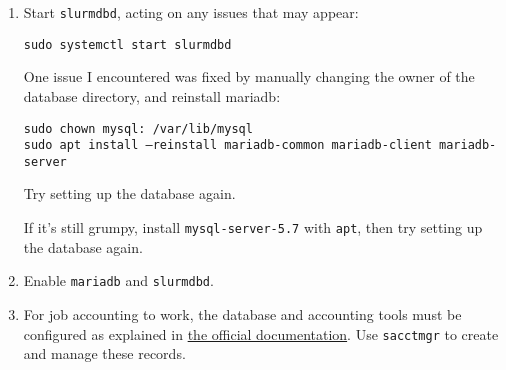 \begin{enumerate}
\begin{enumerate}
        \begin{verbatim}
		[mysqld]
		innodb_buffer_pool_size=256M
		innodb_log_file_size=256M
		innodb_lock_wait_timeout=1800
        \end{verbatim}

        To implement this change you must shut down the database and move/remove the log files:

        \begin{verbatim}
		sudo systemctl stop mariadb
		sudo rm /var/lib/mysql/ib_logfile?
		sudo systemctl start mariadb
        \end{verbatim}

        Verify the new buffer setting using the following command in the MariaDB shell:

        \texttt{MariaDB [(none)]> SHOW VARIABLES LIKE innodb\_buffer\_pool\_size;}

        This has been left as the default for now (obviously).

      \item Exit MariaDB:

        \texttt{MariaDB [(none)]> QUIT;}
    \end{enumerate}

  \item Start \texttt{slurmdbd}, acting on any issues that may appear:

    \texttt{sudo systemctl start slurmdbd}

    One issue I encountered was fixed by manually changing the owner of the database directory, and reinstall mariadb:
	
    \texttt{sudo chown mysql: /var/lib/mysql} \\
	\texttt{sudo apt install --reinstall mariadb-common mariadb-client mariadb-server}
	
	Try setting up the database again.

	If it's still grumpy, install \texttt{mysql-server-5.7} with \texttt{apt}, then try setting up the database again.

  \item Enable \texttt{mariadb} and \texttt{slurmdbd}.


  \item For job accounting to work, the database and accounting tools must be configured as explained in \href{https://slurm.schedmd.com/accounting.html#database-configuration}{the official documentation}. Use \texttt{sacctmgr} to create and manage these records.


\end{enumerate}
